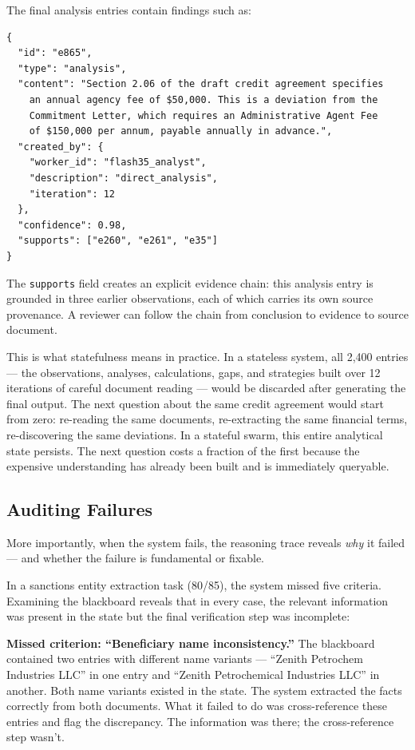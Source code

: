 \documentclass[11pt,a4paper]{article}
\begin{document}
The final analysis entries contain findings such as:

\begin{lstlisting}
{
  "id": "e865",
  "type": "analysis",
  "content": "Section 2.06 of the draft credit agreement specifies
    an annual agency fee of $50,000. This is a deviation from the
    Commitment Letter, which requires an Administrative Agent Fee
    of $150,000 per annum, payable annually in advance.",
  "created_by": {
    "worker_id": "flash35_analyst",
    "description": "direct_analysis",
    "iteration": 12
  },
  "confidence": 0.98,
  "supports": ["e260", "e261", "e35"]
}
\end{lstlisting}

The \texttt{supports} field creates an explicit evidence chain: this analysis entry is grounded in three earlier observations, each of which carries its own source provenance. A reviewer can follow the chain from conclusion to evidence to source document.

This is what statefulness means in practice. In a stateless system, all 2,400 entries — the observations, analyses, calculations, gaps, and strategies built over 12 iterations of careful document reading — would be discarded after generating the final output. The next question about the same credit agreement would start from zero: re-reading the same documents, re-extracting the same financial terms, re-discovering the same deviations. In a stateful swarm, this entire analytical state persists. The next question costs a fraction of the first because the expensive understanding has already been built and is immediately queryable.

\subsection{Auditing Failures}

More importantly, when the system fails, the reasoning trace reveals \textit{why} it failed — and whether the failure is fundamental or fixable.

In a sanctions entity extraction task (80/85), the system missed five criteria. Examining the blackboard reveals that in every case, the relevant information was present in the state but the final verification step was incomplete:

\textbf{Missed criterion: ``Beneficiary name inconsistency.''} The blackboard contained two entries with different name variants — ``Zenith Petrochem Industries LLC'' in one entry and ``Zenith Petrochemical Industries LLC'' in another. Both name variants existed in the state. The system extracted the facts correctly from both documents. What it failed to do was cross-reference these entries and flag the discrepancy. The information was there; the cross-reference step wasn't.
\end{document}
